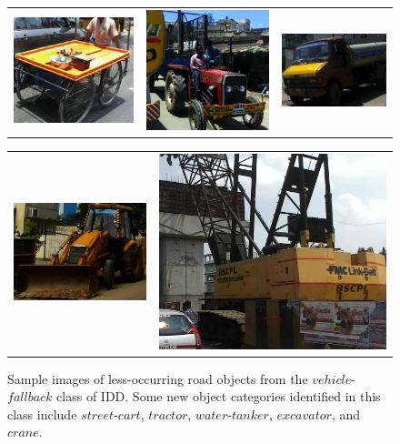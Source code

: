 \documentclass[letterpaper]{article} %
\begin{document}
\begin{figure}[t]
\centering
\begin{tabular}{ccc}
\includegraphics[height=0.21\linewidth,width=0.30\linewidth]{street_cart_10.jpg}
&
\includegraphics[height=0.21\linewidth,width=0.30\linewidth]{tractor_10.jpg}
&
\includegraphics[height=0.21\linewidth,width=0.30\linewidth]{water_tanker_13.jpg}\\
\end{tabular}
\begin{tabular}{cc}
\includegraphics[height=0.21\linewidth,width=0.30\linewidth]{JCB_23.jpg}
&
\includegraphics[height=0.21\linewidth,width=0.30\linewidth]{crane_00.jpg}
\end{tabular}
\caption{Sample images of less-occurring road objects from the $vehicle$-$fallback$ class of IDD. Some new object categories identified in this class include $street$-$cart$, $tractor$, $water$-$tanker$, $excavator$, and $crane$.}
\label{fig_vfb}
\end{figure}
\end{document}
